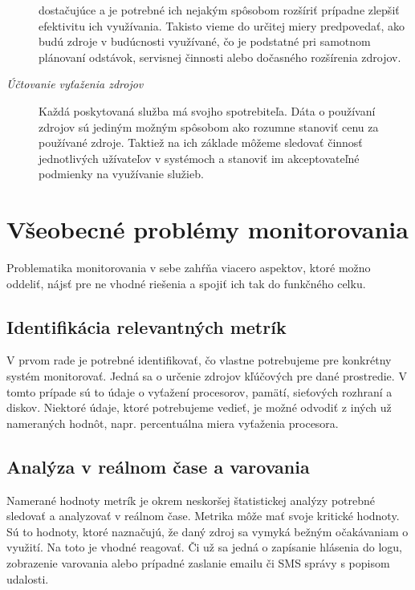 \documentclass[printed,11pt,twoside,color,cover,table]{fithesis3}
\begin{document}
\begin{description}
dostačujúce a je potrebné ich nejakým spôsobom rozšíriť prípadne zlepšiť efektivitu ich využívania. Takisto vieme do určitej miery predpovedať, ako budú zdroje v budúcnosti využívané, čo je podstatné pri samotnom plánovaní 
odstávok, servisnej činnosti alebo dočasného rozšírenia zdrojov.
\item[\emph{Účtovanie vyťaženia zdrojov}]
Každá poskytovaná služba má svojho spotrebiteľa. Dáta o používaní zdrojov sú jediným možným spôsobom ako rozumne stanoviť cenu za používané zdroje.
Taktiež na ich základe môžeme sledovať činnosť jednotlivých užívateľov v systémoch a stanoviť im akceptovateľné podmienky na využívanie služieb.
\end{description}

\section{Všeobecné problémy monitorovania}
Problematika monitorovania v sebe zahŕňa viacero aspektov, ktoré možno oddeliť, nájsť pre ne vhodné riešenia a spojiť ich tak do funkčného celku. 

\subsection{Identifikácia relevantných metrík}
V prvom rade je potrebné identifikovať, čo vlastne potrebujeme pre konkrétny systém monitorovať. Jedná sa o určenie zdrojov kľúčových pre dané prostredie. V tomto prípade sú to údaje o vyťažení
procesorov, pamätí, sieťových rozhraní a diskov. Niektoré údaje, ktoré potrebujeme vedieť, je možné odvodiť z iných už nameraných hodnôt, napr. percentuálna miera vyťaženia procesora. 

\subsection{Analýza v reálnom čase a varovania}
Namerané hodnoty metrík je okrem neskoršej štatistickej analýzy potrebné sledovať a analyzovať v reálnom čase. Metrika môže mať svoje kritické hodnoty. Sú to hodnoty, ktoré naznačujú, že daný zdroj sa vymyká bežným očakávaniam o využití.
Na toto je vhodné reagovať. Či už sa jedná o zapísanie hlásenia do logu, zobrazenie varovania alebo prípadné zaslanie emailu či SMS správy s popisom udalosti.
\end{document}
